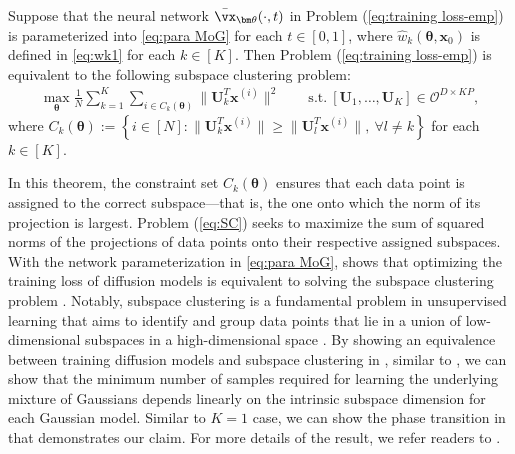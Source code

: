 \documentclass[../../book-main.tex]{subfiles}
\begin{document}
\begin{theorem}\label{thm:3}
    Suppose that the neural network $\bar{\vx}_{\bm \theta}(\cdot,t)$ in Problem (\ref{eq:training loss-emp}) is parameterized into \eqref{eq:para MoG} for each $t \in [0,1]$, where $\hat{w}_k(\bm \theta, \bm x_0)$ is defined in \eqref{eq:wk1} for each $k \in [K]$. Then Problem (\ref{eq:training loss-emp}) is equivalent to the following subspace clustering problem: 
    \begin{align}\label{eq:SC}
        \max_{\bm \theta} \frac{1}{N} \sum_{k=1}^K \sum_{ i \in C_k(\bm \theta)} \|\bm U_k^T\bm x^{(i)}\|^2\qquad \mathrm{s.t.}\ \left[
            \bm U_1, \dots, \bm U_K \right] \in \mathcal{O}^{D \times KP}, 
    \end{align}
    where $C_k(\bm \theta) := \left\{ i\in [N]: \|\bm U_k^T\bm x^{(i)}\| \ge \|\bm U_l^T\bm x^{(i)}\|,\ \forall l \neq k \right\}$ for each $k \in [K]$.
\end{theorem} 
In this theorem, the constraint set $C_k(\bm \theta)$ ensures that each data point is assigned to the correct subspace—that is, the one onto which the norm of its projection is largest. Problem (\ref{eq:SC}) seeks to maximize the sum of squared norms of the projections of data points onto their respective assigned subspaces. With the network parameterization in \eqref{eq:para MoG},  shows that optimizing the training loss of diffusion models is equivalent to solving the subspace clustering problem \citep{vidal2011subspace,wang2022convergence}.  Notably, subspace clustering is a fundamental problem in unsupervised learning that aims to identify and group data points that lie in a union of low-dimensional subspaces in a high-dimensional space \citep{vidal2011subspace,lerman2018overview}. By showing an equivalence between training diffusion models and subspace clustering in , similar to , we can show that the minimum number of samples required for learning the underlying mixture of Gaussians depends linearly on the intrinsic subspace dimension for each Gaussian model. Similar to $K=1$ case, we can show the phase transition in  that demonstrates our claim. For more details of the result, we refer readers to \cite{wang2024diffusion}.
\end{document}
